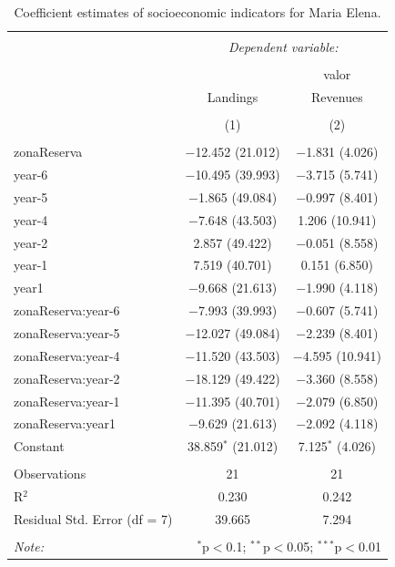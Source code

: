 \documentclass[utf8]{frontiers_suppmat} %
\begin{document}
\begin{table}[!htbp] \centering 
  \caption{Coefficient estimates of socioeconomic indicators for Maria Elena.} 
  \label{} 
\tiny 
\begin{tabular}{@{\extracolsep{1pt}}lcc} 
\\[-1.8ex]\hline 
\hline \\[-1.8ex] 
 & \multicolumn{2}{c}{\textit{Dependent variable:}} \\ 
\cline{2-3} 
\\[-1.8ex] &  & valor \\ 
 & Landings & Revenues \\ 
\\[-1.8ex] & (1) & (2)\\ 
\hline \\[-1.8ex] 
 zonaReserva & $-$12.452 (21.012) & $-$1.831 (4.026) \\ 
  year-6 & $-$10.495 (39.993) & $-$3.715 (5.741) \\ 
  year-5 & $-$1.865 (49.084) & $-$0.997 (8.401) \\ 
  year-4 & $-$7.648 (43.503) & 1.206 (10.941) \\ 
  year-2 & 2.857 (49.422) & $-$0.051 (8.558) \\ 
  year-1 & 7.519 (40.701) & 0.151 (6.850) \\ 
  year1 & $-$9.668 (21.613) & $-$1.990 (4.118) \\ 
  zonaReserva:year-6 & $-$7.993 (39.993) & $-$0.607 (5.741) \\ 
  zonaReserva:year-5 & $-$12.027 (49.084) & $-$2.239 (8.401) \\ 
  zonaReserva:year-4 & $-$11.520 (43.503) & $-$4.595 (10.941) \\ 
  zonaReserva:year-2 & $-$18.129 (49.422) & $-$3.360 (8.558) \\ 
  zonaReserva:year-1 & $-$11.395 (40.701) & $-$2.079 (6.850) \\ 
  zonaReserva:year1 & $-$9.629 (21.613) & $-$2.092 (4.118) \\ 
  Constant & 38.859$^{*}$ (21.012) & 7.125$^{*}$ (4.026) \\ 
 \hline \\[-1.8ex] 
Observations & 21 & 21 \\ 
R$^{2}$ & 0.230 & 0.242 \\ 
Residual Std. Error (df = 7) & 39.665 & 7.294 \\ 
\hline 
\hline \\[-1.8ex] 
\textit{Note:}  & \multicolumn{2}{r}{$^{*}$p$<$0.1; $^{**}$p$<$0.05; $^{***}$p$<$0.01} \\ 
\end{tabular} 
\end{table}
\end{document}
